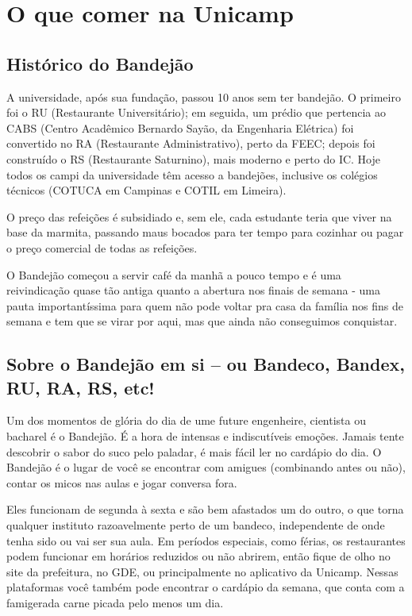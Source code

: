 \section{O que comer na Unicamp}

\subsection{Histórico do Bandejão}

A universidade, após sua fundação, passou 10 anos sem ter bandejão. O primeiro foi o
RU (Restaurante Universitário); em seguida, um prédio que pertencia ao CABS (Centro
Acadêmico Bernardo Sayão, da Engenharia Elétrica) foi convertido no RA (Restaurante
Administrativo), perto da FEEC; depois foi construído o RS (Restaurante Saturnino), mais
moderno e perto do IC. Hoje todos os campi da universidade têm acesso a bandejões,
inclusive os colégios técnicos (COTUCA em Campinas e COTIL em Limeira).

O preço das refeições é subsidiado e, sem ele, cada estudante teria que viver na base
da marmita, passando maus bocados para ter tempo para cozinhar ou pagar o preço
comercial de todas as refeições.

O Bandejão começou a servir café da manhã a pouco tempo e é uma reivindicação
quase tão antiga quanto a abertura nos finais de semana - uma pauta importantíssima
para quem não pode voltar pra casa da família nos fins de semana e tem que se virar
por aqui, mas que ainda não conseguimos conquistar.

\subsection{Sobre o Bandejão em si – ou Bandeco, Bandex, RU, RA, RS, etc!}

Um dos momentos de glória do dia de ume future engenheire, cientista ou bacharel é
o Bandejão. É a hora de intensas e indiscutíveis emoções. Jamais tente descobrir o sabor
do suco pelo paladar, é mais fácil ler no cardápio do dia. O Bandejão é o lugar de você se
encontrar com amigues (combinando antes ou não), contar os micos nas aulas e jogar
conversa fora.

Eles funcionam de segunda à sexta e são bem afastados um do outro, o que torna
qualquer instituto razoavelmente perto de um bandeco, independente de onde tenha
sido ou vai ser sua aula. Em períodos especiais, como férias, os restaurantes podem
funcionar em horários reduzidos ou não abrirem, então fique de olho no site da
prefeitura, no GDE, ou principalmente no aplicativo da Unicamp. Nessas plataformas
você também pode encontrar o cardápio da semana, que conta com a famigerada carne
picada pelo menos um dia.

